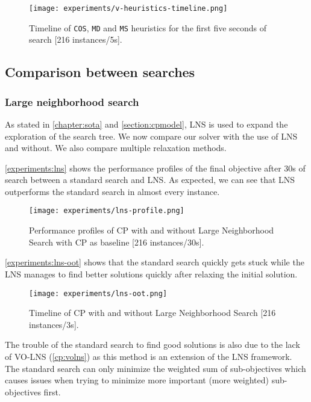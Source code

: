 \documentclass[../../thesis.tex]{subfiles}
\begin{document}
\begin{figure}
  \centering
  \texttt{[image: experiments/v-heuristics-timeline.png]}
  \caption{Timeline of \texttt{COS}, \texttt{MD} and \texttt{MS} heuristics for the first five seconds of search [216 instances/5s].}
  \label{experiments:v-heuristics-timeline}
\end{figure}

\FloatBarrier

\subsection{Comparison between searches}

\subsubsection{Large neighborhood search}


As stated in \autoref{chapter:sota} and \autoref{section:cpmodel}, LNS is used to expand the exploration
of the search tree. We now compare our solver with the use of LNS and without. We also compare multiple 
relaxation methods.


\autoref{experiments:lns} shows the performance profiles of the final objective after 30s of search 
between a standard search and LNS. As expected, we can see that LNS outperforms the standard search 
in almost every instance. 

\begin{figure}[H]
  \centering
  \texttt{[image: experiments/lns-profile.png]}
  \caption{Performance profiles of CP with and without Large Neighborhood Search with CP as baseline [216 instances/30s].}
  \label{experiments:lns}
\end{figure}


\autoref{experiments:lns-oot} shows that the standard search quickly gets stuck
while the LNS manages to find better solutions quickly after relaxing the initial solution.


\begin{figure}
  \centering
  \texttt{[image: experiments/lns-oot.png]}
  \caption{Timeline of CP with and without Large Neighborhood Search [216 instances/3s].}
  \label{experiments:lns-oot}
\end{figure}


\FloatBarrier

The trouble of the standard search to find good solutions is also due to the lack of VO-LNS (\autoref{cp:volns}) as 
this method is an extension of the LNS framework. The standard search can only minimize the weighted sum of sub-objectives
which causes issues when trying to minimize more important (more weighted) sub-objectives first.
\end{document}

